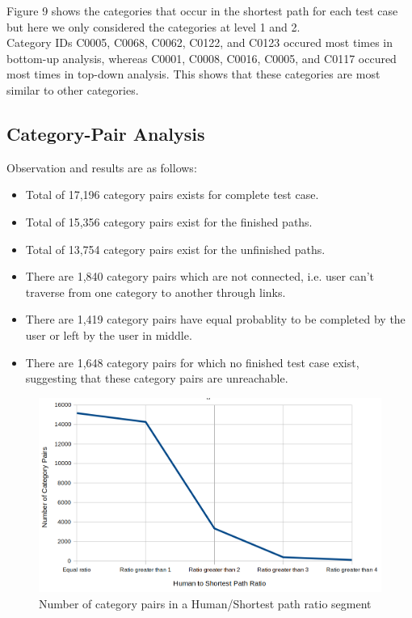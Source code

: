 \documentclass[12pt]{article}
\begin{document}
Figure 9 shows the categories that occur in the shortest path for each test case but here we only considered the categories at level 1 and 2.\\
Category IDs C0005, C0068, C0062, C0122, and C0123 occured most times in bottom-up analysis, whereas C0001, C0008, C0016, C0005, and C0117 occured most times in top-down analysis. This shows that these categories are most similar to other categories. 


\subsection{Category-Pair Analysis}
Observation and results are as follows:
\begin{itemize}
	\item Total of 17,196 category pairs exists for complete test case.
	\item Total of 15,356 category pairs exist for the finished paths.
	\item Total of 13,754 category pairs exist for the unfinished paths.
	\item There are 1,840 category pairs which are not connected, i.e. user can't traverse from one category to another through links.
	\item There are 1,419 category pairs have equal probablity to be completed by the user or left by the user in middle.
	\item There are 1,648 category pairs for which no finished test case exist, suggesting that these category pairs are unreachable. 
\end{itemize}

\begin{figure}[h]
    \centering
    \includegraphics[scale = 0.33]{images/q11.png}
    \caption{Number of category pairs in a Human/Shortest path ratio segment}
\end{figure}
\end{document}
